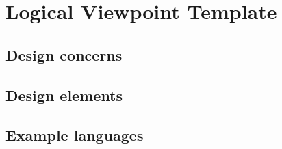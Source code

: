 \chapter{Logical Viewpoint Template} \label{chp:logical-viewpoint-template}
	\begin{comment}
		The purpose of the Logical viewpoint is to elaborate existing and designed types and their implementations
		as classes and interfaces with their structural static relationships. This viewpoint also uses examples of
		instances of types in outlining design ideas.
	\end{comment}
	
	\section{Design concerns} \label{s:logical-viewpoint-template:design-concerns}
		\begin{comment}
			The Logical viewpoint is used to address the development and reuse of adequate abstractions and their
			implementations. For any implementation platform, a set of types is readily available for the domain
			abstractions of interest in a design subject, and a number of new types is to be designed, some of which
			may be considered for reuse. The main concern is the proper choice of abstractions and their expression in
			terms of existing types (some of which may had been specific to the design subject).
		\end{comment}
	
	\section{Design elements} \label{s:logical-viewpoint-template:design-elements}
		\begin{comment}
			Design entities: class, interface, power type, data type, object, attribute, method, association class, template,
			and namespace.
			
			Design relationships: association, generalization, dependency, realization, implementation, instance of,
			composition, and aggregation.
			
			Design attributes: name, role name, visibility, cardinality, type, stereotype, redefinition, tagged value,
			parameter, and navigation efficiency.
			
			Design constraints: value constraints, relationships exclusivity constraints, navigability, generalization sets,
			multiplicity, derivation, changeability, initial value, qualifier, ordering, static, pre-condition, post-condition,
			and generalization set constraints.
		\end{comment}
	
	\section{Example languages} \label{s:logical-viewpoint-template:example-languages}
		\begin{comment}
			UML class diagrams and UML object diagrams (showing objects as instances of their respective classes)
			(OMG [B28]). Lattices of types and references to implemented types are commonly used as supplementary
			information.
		\end{comment}